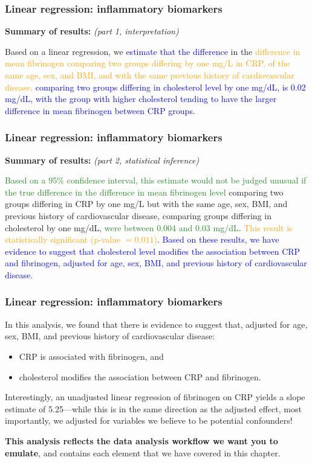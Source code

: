\documentclass[12pt, 
hyperref={colorlinks=true, linkcolor=blue, urlcolor=cyan},dvipsnames]{beamer}
\begin{document}
\begin{frame}
\frametitle{Linear regression: inflammatory biomarkers}
\textbf{Summary of results:} \textit{(part 1, interpretation)}

Based on a linear regression, we \textcolor{blue}{estimate that the difference} in the \textcolor{orange}{difference in mean fibrinogen comparing two groups differing by one mg/L in CRP, of the same age, sex, and BMI, and with the same previous history of cardiovascular disease,} \textcolor{blue}{comparing two groups differing in cholesterol level by one mg/dL, is 0.02 mg/dL, with the group with higher cholesterol tending to have the larger difference in mean fibrinogen between CRP groups}.

\end{frame}

\begin{frame}
\frametitle{Linear regression: inflammatory biomarkers}
\textbf{Summary of results:} \textit{(part 2, statistical inference)}

\textcolor{ForestGreen}{Based on a 95\% confidence interval, this estimate would not be judged unusual if the true difference in the difference in mean fibrinogen level} comparing two groups differing in CRP by one mg/L but with the same age, sex, BMI, and previous history of cardiovascular disease, comparing groups differing in cholesterol by one mg/dL, \textcolor{ForestGreen}{were between 0.004 and 0.03 mg/dL}. \textcolor{orange}{This result is statistically significant (p-value $= 0.011$)}. \textcolor{blue}{Based on these results, we have evidence to suggest that cholesterol level modifies the association between CRP and fibrinogen, adjusted for age, sex, BMI, and previous history of cardiovascular disease.} 
\end{frame}

\begin{frame}
\frametitle{Linear regression: inflammatory biomarkers}
In this analysis, we found that there is evidence to suggest that, adjusted for age, sex, BMI, and previous history of cardiovascular disease:
\begin{itemize}
\item CRP is associated with fibrinogen, and
\item cholesterol modifies the association between CRP and fibrinogen.
\end{itemize}

Interestingly, an unadjusted linear regression of fibrinogen on CRP yields a slope estimate of 5.25---while this is in the same direction as the adjusted effect, most importantly, we adjusted for variables we believe to be potential confounders!

\textbf{This analysis reflects the data analysis workflow we want you to emulate}, and contains each element that we have covered in this chapter.
\end{frame}
\end{document}
